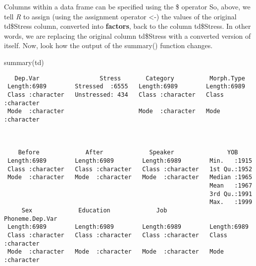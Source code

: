 \documentclass[
  10pt,
  letterpaper]{article}
\newenvironment{Shaded}{\begin{snugshade}}{\end{snugshade}}
\newcommand{\FunctionTok}[1]{\textcolor[rgb]{0.28,0.35,0.67}{#1}}
\newcommand{\NormalTok}[1]{\textcolor[rgb]{0.00,0.23,0.31}{#1}}
\renewcommand\texttt[1]{{\ttfamily\color{BrickRed}#1}}
\begin{document}
Columns within a data frame can be specified using the \texttt{\$}
operator So, above, we tell \emph{R} to assign (using the assignment
operator \texttt{\textless{}-}) the values of the original
\texttt{td\$Stress} column, converted into \textbf{factors}, back to the
column \texttt{td\$Stress}. In other words, we are replacing the
original column \texttt{td\$Stress} with a converted version of itself.
Now, look how the output of the \texttt{summary()} function changes.

\begin{Shaded}
\begin{Highlighting}[]
\FunctionTok{summary}\NormalTok{(td)}
\end{Highlighting}
\end{Shaded}

\begin{verbatim}
   Dep.Var                 Stress       Category          Morph.Type       
 Length:6989        Stressed  :6555   Length:6989        Length:6989       
 Class :character   Unstressed: 434   Class :character   Class :character  
 Mode  :character                     Mode  :character   Mode  :character  
                                                                           
                                                                           
                                                                           
    Before             After             Speaker               YOB      
 Length:6989        Length:6989        Length:6989        Min.   :1915  
 Class :character   Class :character   Class :character   1st Qu.:1952  
 Mode  :character   Mode  :character   Mode  :character   Median :1965  
                                                          Mean   :1967  
                                                          3rd Qu.:1991  
                                                          Max.   :1999  
     Sex             Education             Job            Phoneme.Dep.Var   
 Length:6989        Length:6989        Length:6989        Length:6989       
 Class :character   Class :character   Class :character   Class :character  
 Mode  :character   Mode  :character   Mode  :character   Mode  :character  
                                                                            
                                                                            
                                                                            
\end{verbatim}
\end{document}
